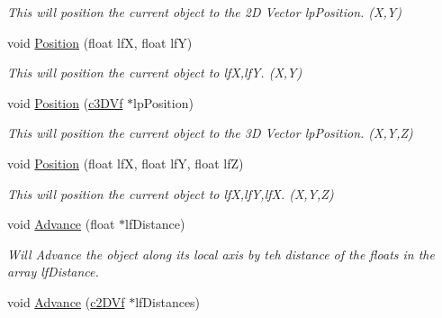 \begin{DoxyCompactItemize}
\begin{DoxyCompactList}\small\item\em This will position the current object to the 2D Vector lpPosition. (X,Y) \end{DoxyCompactList}\item 
\hypertarget{classc_matrix4_a81cd364d37dc5eae6f968551331ad7a3}{
void \hyperlink{classc_matrix4_a81cd364d37dc5eae6f968551331ad7a3}{Position} (float lfX, float lfY)}
\label{classc_matrix4_a81cd364d37dc5eae6f968551331ad7a3}

\begin{DoxyCompactList}\small\item\em This will position the current object to lfX,lfY. (X,Y) \end{DoxyCompactList}\item 
\hypertarget{classc_matrix4_a8a49976693c27e4fbb5fce427eb6bcf5}{
void \hyperlink{classc_matrix4_a8a49976693c27e4fbb5fce427eb6bcf5}{Position} (\hyperlink{classc3_d_vf}{c3DVf} $\ast$lpPosition)}
\label{classc_matrix4_a8a49976693c27e4fbb5fce427eb6bcf5}

\begin{DoxyCompactList}\small\item\em This will position the current object to the 3D Vector lpPosition. (X,Y,Z) \end{DoxyCompactList}\item 
\hypertarget{classc_matrix4_ae404d9b94cb676d9896385fef1eda422}{
void \hyperlink{classc_matrix4_ae404d9b94cb676d9896385fef1eda422}{Position} (float lfX, float lfY, float lfZ)}
\label{classc_matrix4_ae404d9b94cb676d9896385fef1eda422}

\begin{DoxyCompactList}\small\item\em This will position the current object to lfX,lfY,lfX. (X,Y,Z) \end{DoxyCompactList}\item 
\hypertarget{classc_matrix4_a91f9e8d79d7721ba35f59c754a5507d1}{
void \hyperlink{classc_matrix4_a91f9e8d79d7721ba35f59c754a5507d1}{Advance} (float $\ast$lfDistance)}
\label{classc_matrix4_a91f9e8d79d7721ba35f59c754a5507d1}

\begin{DoxyCompactList}\small\item\em Will Advance the object along its local axis by teh distance of the floats in the array lfDistance. \end{DoxyCompactList}\item 
\hypertarget{classc_matrix4_a6c53b28448e2d2531a19cd49955f5901}{
void \hyperlink{classc_matrix4_a6c53b28448e2d2531a19cd49955f5901}{Advance} (\hyperlink{classc2_d_vf}{c2DVf} $\ast$lfDistances)}
\label{classc_matrix4_a6c53b28448e2d2531a19cd49955f5901}


\end{DoxyCompactItemize}
